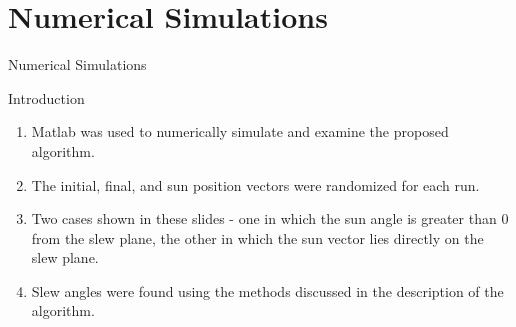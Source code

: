 \documentclass{beamer}
\begin{document}
\section{Numerical Simulations}
\begin{frame}{Numerical Simulations} 
	\begin{block}{Introduction}
		\begin{enumerate}
			\item Matlab was used to numerically simulate and examine the proposed algorithm. 
			\item The initial, final, and sun position vectors were randomized for each run. 
			\item Two cases shown in these slides - one in which the sun angle is greater than 0 from the slew plane, the other in which the sun vector lies directly on the slew plane. 
			\item Slew angles were found using the methods discussed in the description of the algorithm. 
		\end{enumerate}
	\end{block}
\end{frame}
%	
%	
\end{document}

